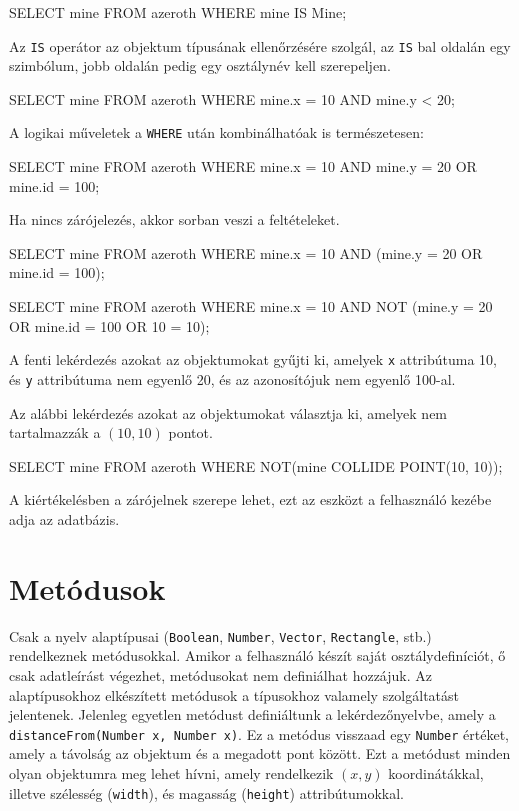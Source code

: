 \begin{sql}
SELECT mine FROM azeroth WHERE mine IS Mine;
\end{sql}

Az \texttt{IS} operátor az objektum típusának ellenőrzésére szolgál, az \texttt{IS} bal oldalán egy szimbólum, jobb oldalán pedig egy osztálynév kell szerepeljen.

\begin{sql}
SELECT mine FROM azeroth WHERE mine.x = 10 AND mine.y < 20;
\end{sql}

A logikai műveletek a \texttt{WHERE} után kombinálhatóak is természetesen:

\begin{sql}
SELECT mine FROM azeroth
WHERE mine.x = 10 AND mine.y = 20 OR mine.id = 100;
\end{sql}

Ha nincs zárójelezés, akkor sorban veszi a feltételeket.

\begin{sql}
SELECT mine FROM azeroth
WHERE mine.x = 10 AND (mine.y = 20 OR mine.id = 100);
\end{sql}

\begin{sql}
SELECT mine FROM azeroth
WHERE mine.x = 10 AND NOT (mine.y = 20 OR mine.id = 100 OR 10 = 10);
\end{sql}

A fenti lekérdezés azokat az objektumokat gyűjti ki, amelyek \texttt{x} attribútuma 10, és \texttt{y} attribútuma nem egyenlő 20, és az azonosítójuk nem egyenlő 100-al.

Az alábbi lekérdezés azokat az objektumokat választja ki, amelyek nem tartalmazzák a $(10, 10)$ pontot.
\begin{sql}
SELECT mine FROM azeroth
WHERE NOT(mine COLLIDE POINT(10, 10));
\end{sql}


A kiértékelésben a zárójelnek szerepe lehet, ezt az eszközt a felhasználó kezébe adja az adatbázis.

\section{Metódusok}

Csak a nyelv alaptípusai (\texttt{Boolean}, \texttt{Number}, \texttt{Vector}, \texttt{Rectangle}, stb.) rendelkeznek metódusokkal. Amikor a felhasználó készít saját osztálydefiníciót, ő csak adatleírást végezhet, metódusokat nem definiálhat hozzájuk. Az alaptípusokhoz elkészített metódusok a típusokhoz valamely szolgáltatást jelentenek. Jelenleg egyetlen metódust definiáltunk a lekérdezőnyelvbe, amely a \texttt{distanceFrom(Number x, Number x)}. Ez a metódus visszaad egy \texttt{Number} értéket, amely a távolság az objektum és a megadott pont között. Ezt a metódust minden olyan objektumra meg lehet hívni, amely rendelkezik $(x, y)$ koordinátákkal, illetve szélesség (\texttt{width}), és magasság (\texttt{height}) attribútumokkal.

